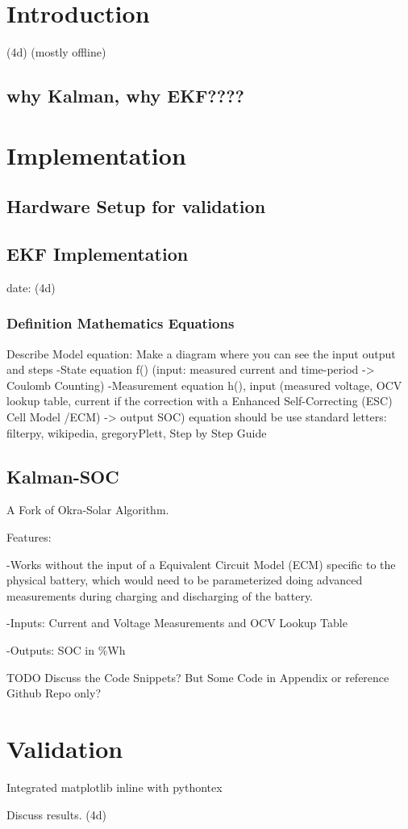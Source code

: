 
\chapter{Introduction}

(4d) (mostly offline)


\section{why Kalman, why EKF????}


\chapter{Implementation}



\section{Hardware Setup for validation}

\section{EKF Implementation}
date: (4d)



\subsection{Definition Mathematics Equations }
 
Describe Model equation: 
Make a diagram where you can see the input output and steps
-State equation f() (input: measured current and time-period -> Coulomb Counting)
-Measurement equation h(), input (measured voltage, OCV lookup table, current if the correction with a Enhanced Self-Correcting (ESC) Cell Model /ECM) -> output SOC)
equation should be use standard letters: filterpy, wikipedia, gregoryPlett, Step by Step Guide

\section{Kalman-SOC}
A Fork of Okra-Solar Algorithm. \

Features: \

-Works without the input of a Equivalent Circuit Model (ECM) specific to the physical battery, which would need to be parameterized doing advanced measurements during charging and discharging of the battery. 

-Inputs: Current and Voltage Measurements and OCV Lookup Table

-Outputs: SOC in \%Wh

TODO Discuss the Code Snippets? But Some Code in Appendix or reference Github Repo only? 
\chapter{Validation}

Integrated matplotlib inline with pythontex

Discuss results.  (4d)
